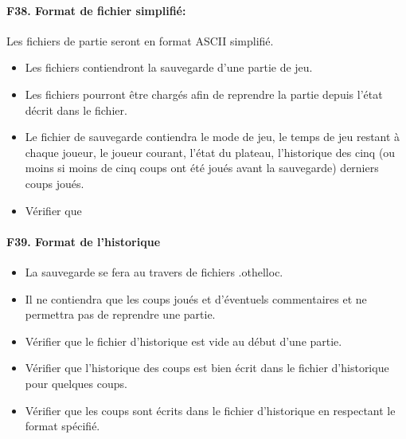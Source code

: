 \documentclass[a4paper,12pt]{article}
\begin{document}
\paragraph{F38. Format de fichier simplifié:} Les fichiers de partie seront en format ASCII simplifié.
\begin{itemize}
  \item Les fichiers contiendront la sauvegarde d'une partie de jeu.
  \item Les fichiers pourront être chargés afin de reprendre la partie depuis l'état
        décrit dans le fichier.
  \item Le fichier de sauvegarde contiendra le mode de jeu, le temps de jeu restant à
        chaque joueur, le joueur courant, l'état du plateau, l'historique des cinq (ou
        moins si moins de cinq coups ont été joués avant la sauvegarde) derniers coups
        joués.
  \item Vérifier que
\end{itemize}

\paragraph{F39. Format de l'historique}
\begin{itemize}
  \item La sauvegarde se fera au travers de fichiers .othelloc.
  \item Il ne contiendra que les coups joués et d'éventuels commentaires et ne
        permettra pas de reprendre une partie.
  \item Vérifier que le fichier d'historique est vide au début d'une partie.
  \item Vérifier que l'historique des coups est bien écrit dans le fichier d'historique
        pour quelques coups.
  \item Vérifier que les coups sont écrits dans le fichier d'historique en respectant
        le format spécifié.
\end{itemize}
\end{document}
